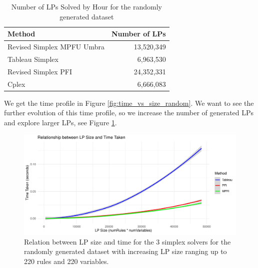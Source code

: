 \begin{table}[!htb]
    \centering
    \caption{Number of LPs Solved by Hour for the randomly generated dataset}
    \begin{tabular}{l|r}
        \toprule
        Method                     & Number of LPs \\
        \midrule
        Revised Simplex MPFU Umbra & 13,520,349    \\
        Tableau Simplex            & 6,963,530     \\
        Revised Simplex PFI        & 24,352,331    \\
        Cplex                      & 6,666,083     \\
        \bottomrule
    \end{tabular}
    \label{fig:lps_per_hour_random}
\end{table} 

We get the time profile in Figure \ref{fig:time_vs_size_random}.
We want to see the further evolution of this time profile, so we increase the number of generated LPs
and explore larger LPs, see Figure \ref{fig:size_time_random_large}.

\begin{figure}[!htb]
    \centering
    \includegraphics[width=\linewidth]{figures/size_time_random_large.pdf}
    \caption{Relation between LP size and time for the 3 simplex solvers for the randomly generated
        dataset with increasing LP size ranging up to 220 rules and 220 variables.}
    \label{fig:size_time_random_large}
\end{figure}

